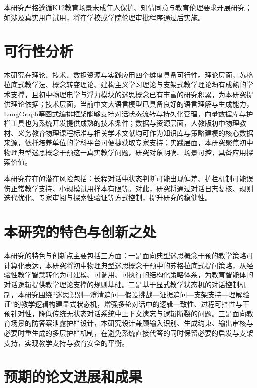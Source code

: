 本研究严格遵循K12教育场景未成年人保护、知情同意与教育伦理要求开展研究；如涉及真实用户试用，将在学校或学院伦理审批程序通过后实施。

\section{可行性分析}

本研究在理论、技术、数据资源与实践应用四个维度具备可行性。理论层面，苏格拉底式教学法、概念转变理论、建构主义学习理论与支架式教学理论均有成熟的学术支撑，且初中物理电学与浮力模块的迷思概念已有丰富的研究积累，为本研究提供理论依据；技术层面，当前中文大语言模型已具备良好的语言理解与生成能力，LangGraph等图式编排框架能够支持对话状态流转与持久化管理，向量数据库与护栏工具也为系统开发提供成熟的技术条件；数据与资源层面，人教版初中物理教材、义务教育物理课程标准与相关学术文献均可作为知识库与策略建模的核心数据来源，依托培养单位的学科平台可便捷获取专家支持；实践层面，本研究聚焦初中物理典型迷思概念干预这一真实教学问题，研究对象明确、场景可控，具备应用探索价值。

本研究存在的潜在风险包括：长程对话中状态判断可能出现偏差、护栏机制可能误伤正常教学支持、小规模试用样本有限等。对此，研究将通过对话日志复核、规则迭代优化、专家审阅与探索性验证等方式控制，提升研究的稳健性。

\section{本研究的特色与创新之处}

本研究的特色与创新点主要包括三方面：一是面向典型迷思概念干预的教学策略可计算化表达，本研究将初中物理典型迷思概念干预中的苏格拉底式提问策略，从经验性教学智慧转化为可建模、可调用、可执行的结构化策略体系，为教育智能体的对话逻辑提供教学理论支撑的规则基础。二是基于显式教学状态机的对话控制机制，本研究围绕“迷思识别—澄清追问—假设挑战—证据追问—支架支持—理解验证”的教学逻辑构建显式状态机，增强多轮对话中的逻辑一致性、过程可控性与干预针对性，降低传统无状态对话系统中上下文遗忘与逻辑断裂的问题。三是面向教育场景的防答案泄露护栏设计，本研究设计兼顾输入识别、生成约束、输出审核与必要时重生成的多层护栏机制，在避免系统直接代答的同时保留必要的启发与支架支持，实现教学支持与教育安全的平衡。

\section{预期的论文进展和成果}


